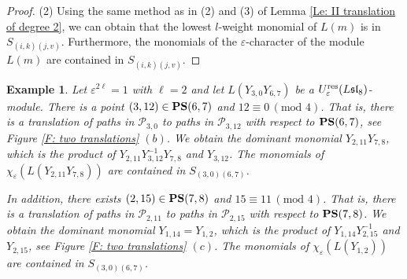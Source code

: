 \documentclass[12pt, reqno]{amsart}
\newtheorem{example}[theorem]{Example}
\numberwithin{equation}{section}
\newcommand{\res}{{\rm res}}
\begin{document}
{\begin{proof}
(2) Using the same method as in (2) and (3) of Lemma \ref{Le: II translation of degree 2}, we can obtain that the lowest $l$-weight monomial of $L(m)$ is in $S_{(i,k)(j,v)}$. Furthermore, the monomials of the $\varepsilon$-character of the module $L(m)$ are contained in $S_{(i,k)(j,v)}$.
\end{proof}




\begin{example}\label{Ex:two translations}
Let $\varepsilon^{2 \ell}=1$ with $\ell=2$ and let $L(Y_{3,0}Y_{6,7})$ be a $U_{\varepsilon}^{\res}({L\mathfrak{sl}_{8}})$-module.
There is a point $(3,12) \in {\bf PS}(6,7)$ and $12 \equiv 0 \, (\text{mod } 4)$. That is, there is a translation of paths in $\mathscr{P}_{3,0}$ to paths in $\mathscr{P}_{3,12}$ with respect to ${\bf PS}(6,7)$, see Figure \ref{F:  two translations} $(b)$. We obtain the dominant monomial $Y_{2,11}Y_{7,8}$, which is the product of $Y_{2,11}Y_{3,12}^{-1}Y_{7,8}$ and $Y_{3,12}$. The monomials of $\chi_\varepsilon(L(Y_{2,11}Y_{7,8}))$ are contained in $S_{(3,0)(6,7)}$.

In addition, there exists $(2,15)\in {\bf PS}(7,8)$ and $15\equiv 11 \, (\text{mod } 4)$. That is, there is a translation of paths in $\mathscr{P}_{2,11}$ to paths in $\mathscr{P}_{2,15}$ with respect to ${\bf PS}(7,8)$. We obtain the dominant monomial $Y_{1,14}=Y_{1,2}$, which is the product of $Y_{1,14}Y_{2,15}^{-1}$ and $Y_{2,15}$, see Figure \ref{F:  two translations} $(c)$. The monomials of $\chi_\varepsilon(L(Y_{1,2}))$ are contained in $S_{(3,0)(6,7)}$.
\end{example}

}
\end{document}
